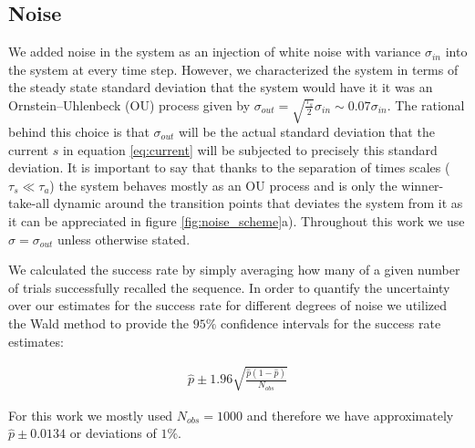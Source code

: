 \documentclass[10pt,a4paper]{article}
\begin{document}
\subsection{Noise}
We added noise in the system as an injection of white noise with variance $\sigma_{in}$ into the system at every time step. However, we characterized the system in terms of the steady state standard deviation that the system would have it it was an Ornstein–Uhlenbeck (OU) process given by $\sigma_{out} = \sqrt{\frac{\tau_s}{2}} \sigma_{in} \sim 0.07 \sigma_{in}$. The rational behind this choice is that $\sigma_{out}$ will be the actual standard deviation that the current $s$ in equation \ref{eq:current} will be subjected to precisely this standard deviation. It is important to say that thanks to the separation of times scales ($\tau_s \ll \tau_a$) the system behaves mostly as an OU process and is only the winner-take-all dynamic around the transition points that deviates the system from it as it can be appreciated in figure \ref{fig:noise_scheme}a). Throughout this work we use $\sigma = \sigma_{out}$ unless otherwise stated. 

We calculated the success rate by simply averaging how many of a given number of trials successfully recalled the sequence. In order to quantify the uncertainty over our estimates for the success rate for different degrees of noise we utilized the Wald method to provide the $95 \% $ confidence intervals for the success rate estimates:

\begin{align} 
\hat{p} \pm 1.96\sqrt{\frac{\hat{p}(1 - \hat{p})}{N_{obs} }} \label{eq:confidence}
\end{align}

For this work we mostly used $N_{obs}=1000$ and therefore we have approximately $\hat{p} \pm 0.0134$ or deviations of $1 \%$.  
\end{document}

